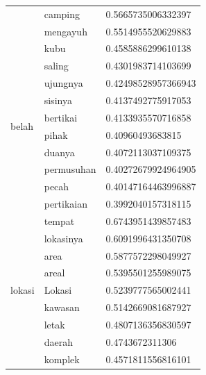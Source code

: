 \begin{enumerate}
\begin{longtable}[c]{|l|l|l|}
                                  & camping         & 0.5665735006332397  \\ \cline{2-3}
                                  & mengayuh        & 0.5514955520629883  \\ \hline
    \multirow[t]{10}{*}{belah}    & kubu            & 0.4585886299610138  \\ \cline{2-3}
                                  & saling          & 0.4301983714103699  \\ \cline{2-3}
                                  & ujungnya        & 0.42498528957366943 \\ \cline{2-3}
                                  & sisinya         & 0.4137492775917053  \\ \cline{2-3}
                                  & bertikai        & 0.4133935570716858  \\ \cline{2-3}
                                  & pihak           & 0.40960493683815    \\ \cline{2-3}
                                  & duanya          & 0.4072113037109375  \\ \cline{2-3}
                                  & permusuhan      & 0.40272679924964905 \\ \cline{2-3}
                                  & pecah           & 0.40147164463996887 \\ \cline{2-3}
                                  & pertikaian      & 0.3992040157318115  \\ \hline
    \multirow[t]{10}{*}{lokasi}   & tempat          & 0.6743951439857483  \\ \cline{2-3}
                                  & lokasinya       & 0.6091996431350708  \\ \cline{2-3}
                                  & area            & 0.5877572298049927  \\ \cline{2-3}
                                  & areal           & 0.5395501255989075  \\ \cline{2-3}
                                  & Lokasi          & 0.5239777565002441  \\ \cline{2-3}
                                  & kawasan         & 0.5142669081687927  \\ \cline{2-3}
                                  & letak           & 0.4807136356830597  \\ \cline{2-3}
                                  & daerah          & 0.4743672311306     \\ \cline{2-3}
                                  & komplek         & 0.4571811556816101  \\ \cline{2-3}

\end{longtable}
\end{enumerate}
